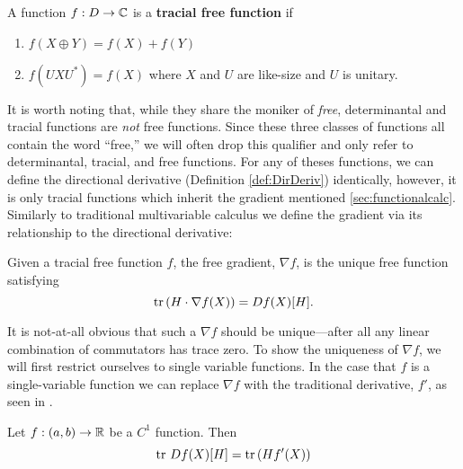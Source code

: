 \begin{definition}%
\label{def:TrFreeFun}
  A function \(f: D \to \mathbb{C} \) is a \textbf{tracial free function} if
  \begin{enumerate}
    \item \(f(X\oplus Y) = f(X)+f(Y)\)
    \item \(f(U X U^*) = f(X)\) where \(X\) and \(U\) are like-size
          and \(U\) is unitary.
  \end{enumerate}
\end{definition}

It is worth noting that, while they share the moniker of \emph{free},
determinantal and tracial functions are \emph{not} free functions.
Since these three classes of functions all contain the word ``free,'' we will
often drop this qualifier and only refer to determinantal, tracial, and free
functions.  For any of theses functions, we can define the directional
derivative (Definition \ref{def:DirDeriv}) identically, however, it is only tracial functions which inherit
the gradient mentioned \cref{sec:functionalcalc}. Similarly to traditional multivariable calculus
we define the gradient via its relationship to the directional derivative:
\begin{definition}%
\label{def:FreeGrad}
  Given a tracial free function \(f\), the free gradient, \(\nabla f\), is the
  unique free function satisfying
  \[
    \operatorname{tr} \left( H \cdot \nabla f(X) \right) = Df(X)[H].
  \]
\end{definition}

It is not-at-all obvious that such a \(\nabla f \) should be unique---after all
any linear combination of commutators has trace zero. To show the uniqueness of
\(\nabla f\), we will first restrict ourselves to single variable functions. In the case that \(f\)
is a single-variable function we can replace \(\nabla f\) with the traditional
derivative, \(f'\), as seen in
\cite[Thm 3.3]{pascoeTrace2020}.
\begin{theorem}
  Let \(f: (a,b)\to \mathbb{R} \) be a \(C^1\) function. Then
  \[
    \operatorname{tr} \, Df(X)[H] = \operatorname{tr} \left( Hf'(X) \right)
  \]
\end{theorem}


